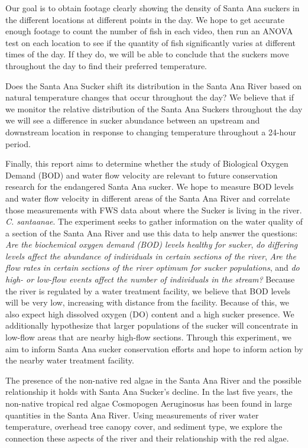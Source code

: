 \documentclass{article}
\begin{document}
Our goal is to obtain footage clearly showing the density of Santa Ana suckers in the different locations at different points in the day.  We hope to get accurate enough footage to count the number of fish in each video, then run an ANOVA test on each location to see if the quantity of fish significantly varies at different times of the day.  If they do, we will be able to conclude that the suckers move throughout the day to find their preferred temperature.

Does the Santa Ana Sucker shift its distribution in the Santa Ana River based on natural temperature changes that occur throughout the day? We believe that if we monitor the relative distribution of the Santa Ana Suckers throughout the day we will see a difference in sucker abundance between an upstream and downstream location in response to changing temperature throughout a 24-hour period.

Finally, this report aims to determine whether the study of Biological Oxygen Demand (BOD) and water flow velocity are relevant to future conservation research for the endangered Santa Ana sucker. We hope to measure BOD levels and water flow velocity in different areas of the Santa Ana River and correlate those measurements with FWS data about where the Sucker is living in the river. \emph{C. santaanae}. The experiment seeks to gather information on the water quality of a section of the Santa Ana River and use this data to help answer the questions: \emph{Are the biochemical oxygen demand (BOD) levels healthy for sucker}, \emph{do differing levels affect the  abundance of individuals in certain sections of the river}, \emph{Are the flow rates in certain sections of the river optimum for sucker populations}, and \emph{do high- or low-flow events affect the number of individuals in the stream?} Because the river is regulated by a water treatment facility, we believe that BOD levels will be very low, increasing with distance from the facility. Because of this, we also expect high dissolved oxygen (DO) content and a high sucker presence. We additionally hypothesize that larger populations of the sucker will concentrate in low-flow areas that are nearby high-flow sections. Through this experiment, we aim to inform Santa Ana sucker conservation efforts and hope to inform action by the nearby water treatment facility. 

The presence of the non-native red algae in the Santa Ana River and the possible relationship it holds with Santa Ana Sucker's decline. In the last five years, the non-native tropical red algae Cosmopogen Aeruginosus has been found in large quantities in the Santa Ana River. Using measurements of river water temperature, overhead tree canopy cover, and sediment type, we explore the connection these aspects of the river and their relationship with the red algae.
\end{document}
